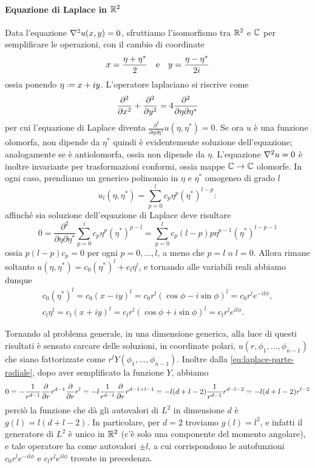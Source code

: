 \paragraph{Equazione di Laplace in $\mathbb{R}^2$}
Data l'equazione $\nabla^2 u(x,y)=0$, sfruttiamo l'isomorfismo tra $\mathbb{R}^2$ e $\mathbb{C}$ per semplificare le operazioni, con il cambio di coordinate
\begin{equation}
	x=\frac{\eta+\eta^*}2\quad\text{e}\quad y=\frac{\eta-\eta^*}{2i}
\end{equation}
ossia ponendo $\eta\defeq x+iy$.
L'operatore laplaciano si riscrive come
\begin{equation}
	\frac{\partial^2 {}}{\partial {x}^2}+\frac{\partial^2 {}}{\partial {y}^2}=4\frac{\partial^2}{\partial\eta\partial\eta^*}
\end{equation}
per cui l'equazione di Laplace diventa $\frac{\partial^2}{\partial\eta\partial\eta^*}u(\eta,\eta^*)=0$.
Se ora $u$ è una funzione olomorfa, non dipende da $\eta^*$ quindi è evidentemente soluzione dell'equazione; analogamente se è antiolomorfa, ossia non dipende da $\eta$.
L'equazione $\nabla^2 u=0$ è inoltre invariante per trasformazioni conformi, ossia mappe $\mathbb{C}\to\mathbb{C}$ olomorfe.
In ogni caso, prendiamo un generico polinomio in $\eta$ e $\eta^*$ omogeneo di grado $l$
\begin{equation}
	u_l(\eta,\eta^*)=\sum_{p=0}^lc_p\eta^p(\eta^*)^{l-p}:
\end{equation}
affinch\'e sia soluzione dell'equazione di Laplace deve risultare
\begin{equation}
	0=\frac{\partial^2}{\partial\eta\partial\eta^*}\sum_{p=0}^lc_p\eta^p(\eta^*)^{p-l}=\sum_{p=0}^lc_p(l-p)p\eta^{p-1}(\eta^*)^{l-p-1}
\end{equation}
ossia $p(l-p)c_p=0$ per ogni $p=0,\dots,l$, a meno che $p=l$ o $l=0$.
Allora rimane soltanto $u(\eta,\eta^*)=c_0(\eta^*)^l+c_l\eta^l$, e tornando alle variabili reali abbiamo dunque
\begin{equation}
	\begin{gathered}
		c_0(\eta^*)^l=c_0(x-iy)^l=c_0r^l(\cos\phi-i\sin\phi)^l=c_0r^le^{-il\phi},\\
		c_l\eta^l=c_l(x+iy)^l=c_lr^l(\cos\phi+i\sin\phi)^l=c_lr^le^{il\phi}.
	\end{gathered}
\end{equation}

Tornando al problema generale, in una dimensione generica, alla luce di questi risultati è sensato carcare delle soluzioni, in coordinate polari, $u(r,\phi_1,\dots,\phi_{n-1})$ che siano fattorizzate come $r^lY(\phi_1,\dots,\phi_{n-1})$.
Inoltre dalla \eqref{eq:laplace-parte-radiale}, dopo aver semplificato la funzione $Y$, abbiamo
\begin{equation}
	0=-\frac1{r^{d-1}}\frac{\partial {}}{\partial {r}}r^{d-1}\frac{\partial {}}{\partial {r}}r^l=-l\frac1{r^{d-1}}\frac{\partial {}}{\partial {r}}r^{d-1+l-1}=-l(d+l-2)\frac1{r^{d-1}}r^{d-l-2}=-l(d+l-2)r^{l-2}
\end{equation}
perciò la funzione che dà gli autovalori di $L^2$ in dimensione $d$ è $g(l)=l(d+l-2)$.
In particolare, per $d=2$ troviamo $g(l)=l^2$, e infatti il generatore di $L^2$ è unico in $\mathbb{R}^2$ (c'è solo una componente del momento angolare), e tale operatore ha come autovalori $\pm l$, a cui corrispondono le autofunzioni $c_0r^le^{-il\phi}$ e $c_lr^le^{il\phi}$ trovate in precedenza.

